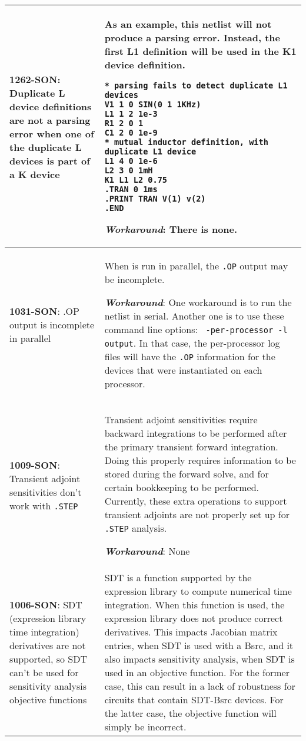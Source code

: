 {\begin{longtable}[h] {>{\raggedright\small}m{2in}|>{\raggedright\let\\\tabularnewline\small}m{3.5in}}
\textbf{1262-SON}: Duplicate L device definitions are not a parsing error
when one of the duplicate L devices is part of a K device &
As an example, this netlist will not produce a parsing error.  Instead,
the first L1 definition will be used in the K1 device definition.
\begin{verbatim}
* parsing fails to detect duplicate L1 devices
V1 1 0 SIN(0 1 1KHz)
L1 1 2 1e-3
R1 2 0 1
C1 2 0 1e-9
* mutual inductor definition, with duplicate L1 device
L1 4 0 1e-6
L2 3 0 1mH
K1 L1 L2 0.75
.TRAN 0 1ms
.PRINT TRAN V(1) v(2)
.END
\end{verbatim}

\textbf{\textit{Workaround}}:
There is none.
\\ \hline

\textbf{1031-SON}: .OP output is incomplete in parallel & When \Xyce{}
is run in parallel, the \texttt{.OP} output may be incomplete. 

\textbf{\textit{Workaround}}: One workaround is to run the netlist in 
serial.  Another one is to use these command line options: \texttt{
-per-processor -l output}.  In that case, the per-processor log files 
will have the \texttt{.OP} information for the devices that were 
instantiated on each processor.
\\ \hline 

  \textbf{1009-SON}:  Transient adjoint sensitivities don't work with \texttt{.STEP}
  & Transient adjoint sensitivities require backward integrations to be performed after the primary transient forward integration.  Doing this properly requires information to be stored during the forward solve, and for certain bookkeeping to be performed.  Currently, these extra operations to support transient adjoints are not properly set up for \texttt{.STEP} analysis.

\textbf{\textit{Workaround}}: None
\\ \hline

  \textbf{1006-SON}:   SDT (expression library time integration) derivatives are not supported, so SDT can't be used for sensitivity analysis objective functions &
  SDT is a function supported by the \Xyce{} expression library to compute numerical time integration.  When this function is used, the expression library does not produce correct derivatives.  This impacts Jacobian matrix entries, when SDT is used with a Bsrc, and it also impacts sensitivity analysis, when SDT is used in an objective function.  For the former case, this can result in a lack of robustness for circuits that contain SDT-Bsrc devices.  For the latter case, the objective function will simply be incorrect.


\end{longtable}}
